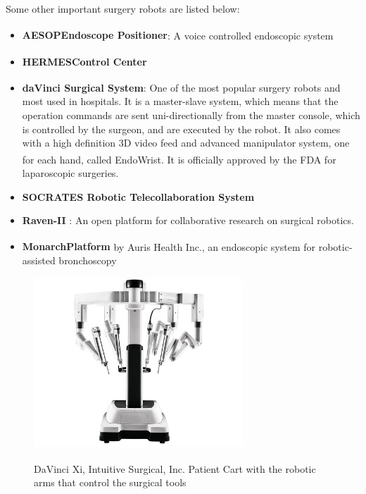 Some other important surgery robots are listed below:
\begin{itemize}
\item \textbf{AESOP\textsuperscript \textregistered Endoscope Positioner}: A voice controlled endoscopic system
\item \textbf{HERMES\textsuperscript \textregistered Control Center}
\item \textbf{daVinci Surgical System\textsuperscript \textregistered}: One of the most popular surgery robots and most used 
in hospitals. It is a master-slave system, which means that the operation commands are sent uni-directionally from the master 
console, which is controlled by the surgeon, and are executed by the robot. It also comes with a high definition 3D video feed 
and advanced manipulator system, one for each hand, called EndoWrist\textsuperscript \textregistered. It is officially approved 
by the FDA for laparoscopic surgeries.
\item \textbf{SOCRATES Robotic Telecollaboration System}
\item \textbf{Raven-II} \cite{Raven2}: An open platform for collaborative research on surgical robotics.
\item \textbf{Monarch\textsuperscript \texttrademark Platform} by Auris Health Inc., an endoscopic system for robotic-assisted 
bronchoscopy
\end{itemize}

\begin{center}
\begin{figure}[H]
\centering
\includegraphics[width=0.7\textwidth]{images/intuitive-da-vinci-xi-patient-cart-front-view-1060867-lo-res.jpg}\\
\caption{DaVinci Xi, \textsuperscript {} Intuitive Surgical, Inc. Patient Cart with the robotic arms that control the surgical tools}
\end{figure}
\end{center}

